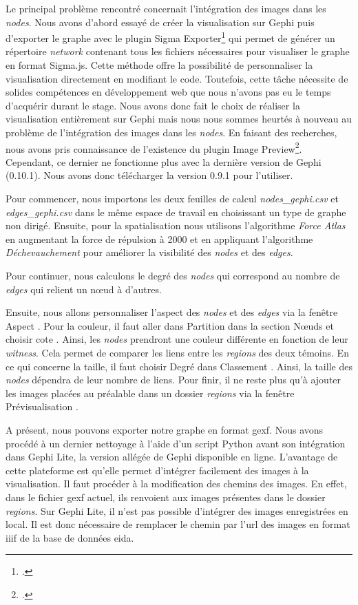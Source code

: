 Le principal problème rencontré concernait l'intégration des images dans les \textit{nodes}. Nous avons d'abord essayé de créer la visualisation sur Gephi puis d'exporter le graphe avec le plugin Sigma Exporter\footcite{alvarezSigmaExporter2023} qui permet de générer un répertoire \textit{network} contenant tous les fichiers nécessaires pour visualiser le graphe en format Sigma.js. Cette méthode offre la possibilité de personnaliser la visualisation directement en modifiant le code. Toutefois, cette tâche nécessite de solides compétences en développement web que nous n'avons pas eu le temps d'acquérir durant le stage. Nous avons donc fait le choix de réaliser la visualisation entièrement sur Gephi mais nous nous sommes heurtés à nouveau au problème de l'intégration des images dans les \textit{nodes}. En faisant des recherches, nous avons pris connaissance de l'existence du plugin Image Preview\footcite{xueGephiImagePreview2015}. Cependant, ce dernier ne fonctionne plus avec la dernière version de Gephi (0.10.1). Nous avons donc télécharger la version 0.9.1 pour l'utiliser.

Pour commencer, nous importons les deux feuilles de calcul \textit{nodes\_gephi.csv} et \textit{edges\_gephi.csv} dans le même espace de travail en choisissant un type de graphe non dirigé. Ensuite, pour la spatialisation nous utilisons l'algorithme \textit{Force Atlas} en augmentant la force de répulsion à 2000 et en appliquant l'algorithme \textit{Déchevauchement} pour améliorer la visibilité des \textit{nodes} et des \textit{edges}.

Pour continuer, nous calculons le degré des \textit{nodes} qui correspond au nombre de \textit{edges} qui relient un nœud à d'autres. 

Ensuite, nous allons personnaliser l'aspect des \textit{nodes} et des \textit{edges} via la fenêtre \og Aspect \fg. Pour la couleur, il faut aller dans \og Partition \fg dans la section \og Nœuds \fg et choisir \og cote \fg. Ainsi, les \textit{nodes} prendront une couleur différente en fonction de leur \textit{witness}. Cela permet de comparer les liens entre les \textit{regions} des deux témoins. En ce qui concerne la taille, il faut choisir \og Degré \fg dans \og Classement \fg. Ainsi, la taille des \textit{nodes} dépendra de leur nombre de liens. Pour finir, il ne reste plus qu'à ajouter les images placées au préalable dans un dossier \og \textit{regions} \fg via la fenêtre \og Prévisualisation \fg.

A présent, nous pouvons exporter notre graphe en format \gls{gexf}. Nous avons procédé à un dernier nettoyage à l'aide d'un script Python avant son intégration dans Gephi Lite, la version allégée de Gephi disponible en ligne. L'avantage de cette plateforme est qu'elle permet d'intégrer facilement des images à la visualisation. Il faut procéder à la modification des chemins des images. En effet, dans le fichier \gls{gexf} actuel, ils renvoient aux images présentes dans le dossier \textit{regions}. Sur Gephi Lite, il n'est pas possible d'intégrer des images enregistrées en local. Il est donc nécessaire de remplacer le chemin par l'\gls{url} des images en format \gls{iiif} de la base de données \gls{eida}.

